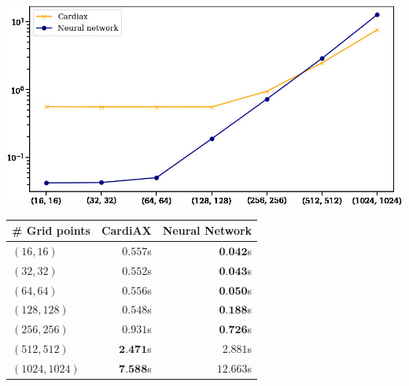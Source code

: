 \documentclass[utf8]{frontiers_suppmat} %
\begin{document}
\begin{minipage}[htp!]{\textwidth}
\begin{minipage}[tp]{0.49\textwidth}
\centering
\vspace{0.2cm}
\includegraphics[width=\textwidth]{figures/old_figures/Figure-11.jpg}
\label{fig:performance}
\end{minipage}
\hfill
\begin{minipage}[tp]{0.49\textwidth}
\centering
\tiny
\begin{tabular}{l r r}                    
    \hline
    \textbf{\# Grid points} & \textbf{CardiAX} & \textbf{Neural Network} \\
    \hline
    $(16, 16)$ & $0.557$s & $\textbf{0.042}$s \\ [2pt]
    $(32, 32)$ & $0.552$s & $\textbf{0.043}$s \\ [2pt]
    $(64, 64)$ & $0.556$s & $\textbf{0.050}$s \\ [2pt]
    $(128, 128)$ & $0.548$s & $\textbf{0.188}$s \\ [2pt]
    $(256, 256)$ & $0.931$s & $\textbf{0.726}$s \\ [2pt]
    $(512, 512)$ & $\textbf{2.471}$s & $2.881$s \\ [2pt]
    $(1024, 1024)$ & $\textbf{7.588}$s & $12.663$s \\
    \hline
\end{tabular}
\label{tab:performance}
\end{minipage}
\end{minipage}
\vspace{0.5cm}
\end{document}
